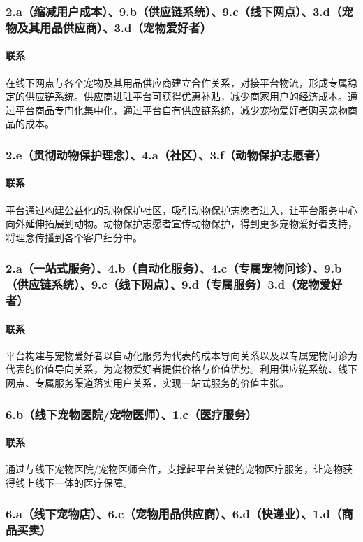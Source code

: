 \documentclass[a4paper]{ctexart}
\begin{document}
\subsubsection{2.a（缩减用户成本）、9.b（供应链系统）、9.c（线下网点）、3.d（宠物及其用品供应商）、3.d（宠物爱好者）}
\paragraph{联系}在线下网点与各个宠物及其用品供应商建立合作关系，对接平台物流，形成专属稳定的供应链系统。供应商进驻平台可获得优惠补贴，减少商家用户的经济成本。通过平台商品专门化集中化，通过平台自有供应链系统，减少宠物爱好者购买宠物商品的成本。
\subsubsection{2.e（贯彻动物保护理念）、4.a（社区）、3.f（动物保护志愿者）}
\paragraph{联系}平台通过构建公益化的动物保护社区，吸引动物保护志愿者进入，让平台服务中心向外延伸拓展到动物。动物保护志愿者宣传动物保护，得到更多宠物爱好者支持，将理念传播到各个客户细分中。
\subsubsection{2.a（一站式服务）、4.b（自动化服务）、4.c（专属宠物问诊）、9.b（供应链系统）、9.c（线下网点）、9.d（专属服务）3.d（宠物爱好者）}
\paragraph{联系}平台构建与宠物爱好者以自动化服务为代表的成本导向关系以及以专属宠物问诊为代表的价值导向关系，为宠物爱好者提供价格与价值优势。利用供应链系统、线下网点、专属服务渠道落实用户关系，实现一站式服务的价值主张。
\subsubsection{6.b（线下宠物医院/宠物医师）、1.c（医疗服务）}
\paragraph{联系}通过与线下宠物医院/宠物医师合作，支撑起平台关键的宠物医疗服务，让宠物获得线上线下一体的医疗保障。
\subsubsection{6.a（线下宠物店）、6.c（宠物用品供应商）、6.d（快递业）、1.d（商品买卖）}
\end{document}
